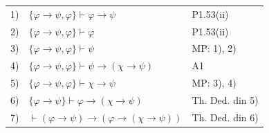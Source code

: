 \begin{solutie}
\begin{center}
\renewcommand{\arraystretch}{1.3}
\begin{tabular}{r l l}
1) & $\{\varphi \rightarrow \psi, \varphi\} \vdash \varphi \rightarrow \psi$ & P1.53(ii) \\
2) & $\{\varphi \rightarrow \psi, \varphi\} \vdash \varphi$ & P1.53(ii) \\
3) & $\{\varphi \rightarrow \psi, \varphi\} \vdash \psi$ & MP: 1), 2) \\
4) & $\{\varphi \rightarrow \psi, \varphi\} \vdash \psi \rightarrow (\chi \rightarrow \psi)$ & A1 \\
5) & $\{\varphi \rightarrow \psi, \varphi\} \vdash \chi \rightarrow \psi$ & MP: 3), 4) \\
6) & $\{\varphi \rightarrow \psi\} \vdash \varphi \rightarrow (\chi \rightarrow \psi)$ & Th. Ded. din 5) \\
7) & $\vdash (\varphi \rightarrow \psi) \rightarrow (\varphi \rightarrow (\chi \rightarrow \psi))$ & Th. Ded. din 6) \\
\end{tabular}
\end{center}

\end{solutie}

